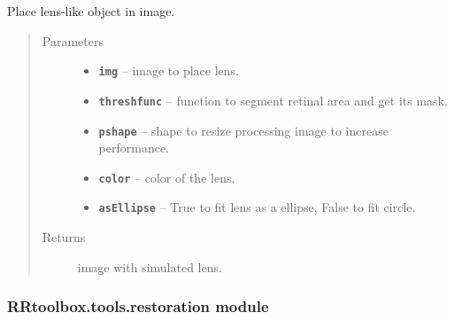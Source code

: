 \documentclass[letterpaper,10pt,english]{sphinxmanual}
\begin{document}
\begin{fulllineitems}
\label{RRtoolbox.tools:RRtoolbox.tools.lens.simulateLens}
Place lens-like object in image.
\begin{quote}\begin{description}
\item[{Parameters}] \leavevmode\begin{itemize}
\item {} 
\textbf{\texttt{img}} -- image to place lens.

\item {} 
\textbf{\texttt{threshfunc}} -- function to segment retinal area and get its mask.

\item {} 
\textbf{\texttt{pshape}} -- shape to resize processing image to increase performance.

\item {} 
\textbf{\texttt{color}} -- color of the lens.

\item {} 
\textbf{\texttt{asEllipse}} -- True to fit lens as a ellipse, False to fit circle.

\end{itemize}

\item[{Returns}] \leavevmode
image with simulated lens.

\end{description}\end{quote}

\end{fulllineitems}



\subsubsection{RRtoolbox.tools.restoration module}
\label{RRtoolbox.tools:rrtoolbox-tools-restoration-module}\label{RRtoolbox.tools:module-RRtoolbox.tools.restoration}
\end{document}

